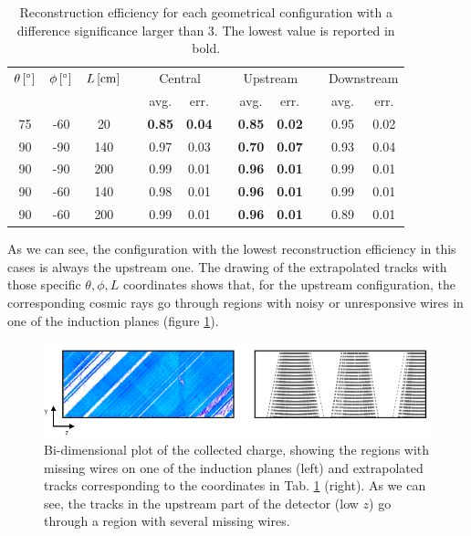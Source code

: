 \documentclass[a4paper]{scrartcl}
\begin{document}
\begin{table}[htbp]
  \centering
  \begin{tabular}{cccccccccccc}
    \toprule
    $\theta\thinspace[^\circ]$ & $\phi\thinspace[^\circ]$ & $L\thinspace[\mathrm{cm}]$ & \phantom{a} & \multicolumn{2}{c}{Central} & \phantom{a} & \multicolumn{2}{c}{Upstream} & \phantom{a} & \multicolumn{2}{c}{Downstream}\\
     \cmidrule{5-6} \cmidrule{8-9} \cmidrule{11-12}
      &  &  & & avg. & err. & & avg. & err. & & avg. & err.   \\
    \midrule
    75 & -60 & 20 & & \textbf{0.85} & \textbf{0.04} & & \textbf{0.85} & \textbf{0.02} & & 0.95 & 0.02\\
    90 & -90 & 140 & & 0.97 & 0.03 & & \textbf{0.70} & \textbf{0.07} & & 0.93 & 0.04\\
    90 & -90 & 200 & & 0.99 & 0.01 & & \textbf{0.96} & \textbf{0.01} & & 0.99 & 0.01\\
    90 & -60 & 140 & & 0.98 & 0.01 & & \textbf{0.96} & \textbf{0.01} & & 0.99 & 0.01\\
    90 & -60 & 200 & & 0.99 & 0.01 & & \textbf{0.96} & \textbf{0.01} & & 0.89 & 0.01\\

    \bottomrule
  \end{tabular}
  \caption{Reconstruction efficiency for each geometrical configuration with a difference significance larger than 3. The lowest value is reported in bold.}\label{tab:significance}
\end{table}

As we can see, the configuration with the lowest reconstruction efficiency in this cases is always the upstream one. The drawing of the extrapolated tracks with those specific $\theta,\phi,L$ coordinates shows that, for the upstream configuration, the corresponding cosmic rays go through regions with noisy or unresponsive wires in one of the induction planes (figure \ref{fig:wires}).

\begin{figure}[htbp]
  \begin{center}
    \includegraphics[width=1\linewidth]{figures/wire_tracks.png}
    \caption{Bi-dimensional plot of the collected charge, showing the regions with missing wires on one of the induction planes (left) and extrapolated tracks corresponding to the coordinates in Tab. \ref{tab:significance} (right). As we can see, the tracks in the upstream part of the detector (low $z$) go through a region with several missing wires.} \label{fig:wires}
  \end{center}
\end{figure}
\end{document}
